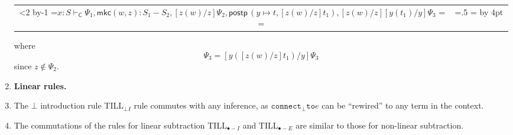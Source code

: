 \documentclass{lmcs}
\def\ScoreOverhang{4pt}			%
\def\ScoreOverhangLeft{\ScoreOverhang}
\def\ScoreOverhangRight{\ScoreOverhang}
\def\extraVskip{2pt}			%
\def\ruleScoreFiller{\hrule}		%
\def\defaultScoreFiller{\ruleScoreFiller}  %
\def\defaultBuildScore{\buildSingleScore}  %
\def\defaultHypSeparation{\hskip.2in}   %
\def\theHypSeparation{\defaultHypSeparation}
\def\alwaysScoreFiller{\defaultScoreFiller}	%
\def\alwaysBuildScore{\defaultBuildScore}
\def\theScoreFiller{\alwaysScoreFiller}	%
\def\buildScore{\alwaysBuildScore}   %
\def\hypKernAmt{0pt}	%
\def\defaultLeftLabel{}
\def\defaultRightLabel{}
\def\myTrue{Y}
\def\bottomAlignFlag{N}
\def\centerAlignFlag{N}
\def\thecur#1{\csname#1\number\theLevel\endcsname}
\def\prepBinary{%
	\ifnum\theLevel<2 
		\errmessage{Hypotheses missing!}
	\fi%
	\edef\rcurBox{\thecur{myBox}}%
	\edef\rcurScoreStart{\thecur{myScoreStart}}%
	\edef\rcurCenter{\thecur{myCenter}}%
	\edef\rcurScoreEnd{\thecur{myScoreEnd}}%
	\advance\theLevel by-1
	\edef\lcurBox{\thecur{myBox}}%
	\edef\lcurScoreStart{\thecur{myScoreStart}}%
	\edef\lcurCenter{\thecur{myCenter}}%
	\edef\lcurScoreEnd{\thecur{myScoreEnd}}%
}
\def\BinaryInfC#1{%
	\prepBinary%
	\buildConclusionC{#1}%
	\joinBinary%
	\resetInferenceDefaults%
	\ignorespaces%
}
\def\buildConclusionC#1{%
	\setbox\myBoxA=\hbox{#1}%
	\setbox\myBoxC =%
		\hbox{\hbox{\hskip\ScoreOverhangLeft\relax%
                        \unhcopy\myBoxA\hskip\ScoreOverhangRight\relax}}%
	\newScoreStart=0pt \relax%
	\newCenter=.5\wd\myBoxC \relax%
	\newScoreEnd=\wd\myBoxC%
        \advance \newCenter by \ScoreOverhangLeft%
}
\def\joinUnary{%
	\global\advance\curCenter by -\hypKernAmt%
	\ifnum\curCenter<\newCenter%
		\displace=\newCenter%
		\advance \displace by -\curCenter%
		\kernUpperBox%
	\else%
		\displace=\curCenter%
		\advance \displace by -\newCenter%
		\kernLowerBox%
	\fi%
        \ifnum \newScoreStart < \curScoreStart %
		\global \curScoreStart = \newScoreStart \fi%
	\ifnum \curScoreEnd < \newScoreEnd %
		\global \curScoreEnd = \newScoreEnd \fi%
	\ifnum \curScoreStart<\wd\myBoxLL%
		\global\displace = \wd\myBoxLL%
		\global\advance\displace by -\curScoreStart%
		\kernUpperBox%
		\kernLowerBox%
	\fi%
	\buildScore%
	\buildScoreLabels%
	\global \setbox \curBox =%
		\vbox{\box\curBox%
			\vskip\thisAboveSkip \relax%
			\nointerlineskip\box\myBoxD%
			\vskip\thisBelowSkip \relax%
			\nointerlineskip\box\myBoxC}%
	\global \curScoreStart=\newScoreStart%
	\global \curScoreEnd=\newScoreEnd%
	\global \curCenter=\newCenter%
}
\def\kernUpperBox{%
		\global\setbox\curBox =%
			\hbox{\hskip\displace\box\curBox}%
		\global\advance \curScoreStart by \displace%
		\global\advance \curScoreEnd by \displace%
		\global\advance\curCenter by \displace%
}
\def\kernLowerBox{%
		\global\setbox\myBoxC =%
			\hbox{\hskip\displace\unhbox\myBoxC}%
		\global\advance \newScoreStart by \displace%
		\global\advance \newScoreEnd by \displace%
		\global\advance\newCenter by \displace%
}
\def\joinBinary{%
	\setbox\myBoxA=\hbox{\theHypSeparation}
	\lcurScoreEnd=\rcurScoreEnd%
	\advance\lcurScoreEnd by\wd\lcurBox%
	\advance\lcurScoreEnd by\wd\myBoxA%
	\displace=\lcurScoreEnd%
	\advance\displace by -\lcurScoreStart%
	\lcurCenter=.5\displace%
	\advance\lcurCenter by\lcurScoreStart%
	\setbox\lcurBox=%
		\hbox{\box\lcurBox\unhcopy\myBoxA\box\rcurBox}%
	\displace=\newCenter%
	\advance\displace by -.5\newScoreStart%
	\advance\displace by -.5\newScoreEnd%
	\advance\lcurCenter by \displace%
	\edef\curBox{\lcurBox}%
	\edef\curScoreStart{\lcurScoreStart}%
	\edef\curScoreEnd{\lcurScoreEnd}%
	\edef\curCenter{\lcurCenter}%
	\joinUnary%
}
\def\DisplayProof{%
	\ifnum \theLevel=1 \relax \else%
		\errmessage{Proof tree badly specified.}%
	\fi%
	\edef\curBox{\thecur{myBox}}%
	\ifx\bottomAlignFlag\myTrue%
		\displace=0pt%
	\else%
		\displace=.5\ht\curBox%
		\ifx\centerAlignFlag\myTrue\relax
		\else%
		      	\advance\displace by -3pt%
		\fi%
	\fi%
	\leavevmode%
	\lower\displace\hbox{\copy\curBox}%
	\global\theLevel=0%
	\global\def\alwaysBuildScore{\defaultBuildScore}%
	\global\def\alwaysScoreFiller{\defaultScoreFiller}%
	\def\bottomAlignFlag{N}
	\def\centerAlignFlag{N}
	\resetInferenceDefaults%
	\ignorespaces
}
\def\buildSingleScore{%
	\displace=\curScoreEnd%
	\advance \displace by -\curScoreStart%
	\global\setbox \myBoxD =%
		\hbox to \displace{\expandafter\xleaders\theScoreFiller\hfill}%
}
\def\singleLine{%
	\gdef\buildScore{\buildSingleScore}%
	\ignorespaces
}
\def\insertBetweenHyps#1{%
	\gdef\theHypSeparation{#1}%
	\ignorespaces
}
\def\buildScoreLabels{%
	\scoreHeight = \ht\myBoxD%
	\scoreDepth = \dp\myBoxD%
	\leftLowerAmt=\ht\myBoxLL%
	\advance \leftLowerAmt by -\dp\myBoxLL%
	\advance \leftLowerAmt by -\scoreHeight%
	\advance \leftLowerAmt by \scoreDepth%
	\leftLowerAmt=.5\leftLowerAmt%
	\rightLowerAmt=\ht\myBoxRL%
	\advance \rightLowerAmt by -\dp\myBoxRL%
	\advance \rightLowerAmt by -\scoreHeight%
	\advance \rightLowerAmt by \scoreDepth%
	\rightLowerAmt=.5\rightLowerAmt%
	\displace = \curScoreStart%
	\advance\displace by -\wd\myBoxLL%
	\global\setbox\myBoxD =%
		\hbox{\hskip\displace%
			\lower\leftLowerAmt\copy\myBoxLL%
			\box\myBoxD%
			\lower\rightLowerAmt\copy\myBoxRL}%
	\global\thisAboveSkip = \ht\myBoxLL%
	\global\advance \thisAboveSkip by -\leftLowerAmt%
	\global\advance \thisAboveSkip by -\scoreHeight%
	\ifnum \thisAboveSkip<0 %
		\global\thisAboveSkip=0pt%
	\fi%
	\displace = \ht\myBoxRL%
	\advance \displace by -\rightLowerAmt%
	\advance \displace by -\scoreHeight%
	\ifnum \displace<0 %
		\displace=0pt%
	\fi%
	\ifnum \displace>\thisAboveSkip %
		\global\thisAboveSkip=\displace%
	\fi%
	\global\thisBelowSkip = \dp\myBoxLL%
	\global\advance\thisBelowSkip by \leftLowerAmt%
	\global\advance\thisBelowSkip by -\scoreDepth%
	\ifnum\thisBelowSkip<0 %
		\global\thisBelowSkip = 0pt%
	\fi%
	\displace = \dp\myBoxLL%
	\advance\displace by \rightLowerAmt%
	\advance\displace by -\scoreDepth%
	\ifnum\displace<0 %
		\displace = 0pt%
	\fi%
	\ifnum\displace>\thisBelowSkip%
		\global\thisBelowSkip = \displace%
	\fi
	\global\thisAboveSkip = -\thisAboveSkip%
	\global\thisBelowSkip = -\thisBelowSkip%
	\global\advance\thisAboveSkip by\extraVskip%
	\global\advance\thisBelowSkip by\extraVskip%
}
\def\resetInferenceDefaults{%
	\global\def\theHypSeparation{\defaultHypSeparation}%
	\global\setbox\myBoxLL=\hbox{\defaultLeftLabel}%
	\global\setbox\myBoxRL=\hbox{\defaultRightLabel}%
	\global\def\buildScore{\alwaysBuildScore}%
	\global\def\theScoreFiller{\alwaysScoreFiller}%
	\gdef\hypKernAmt{0pt}%
}
\def\lsub{\mathrel{\bullet\!-}}
\newcommand{\DualLNLLogicnt}[1]{\mathit{#1}}
\newcommand{\DualLNLLogicmv}[1]{\mathit{#1}}
\newcommand{\DualLNLLogicsym}[1]{#1}
\begin{document}
\begin{enumerate}
\begin{center}
\begin{tabular}{c}
      \BinaryInfC{$ \DualLNLLogicmv{x}  :  \DualLNLLogicnt{S}  \vdash_{\mathsf{C} }  \Psi_{{\mathrm{1}}}  \DualLNLLogicsym{,}   \mathsf{mkc}( \DualLNLLogicmv{w} , \DualLNLLogicmv{z} )   \DualLNLLogicsym{:}   \DualLNLLogicnt{S_{{\mathrm{1}}}}  -  \DualLNLLogicnt{S_{{\mathrm{2}}}}   \DualLNLLogicsym{,}  \DualLNLLogicsym{[}  \DualLNLLogicmv{z}  \DualLNLLogicsym{(}  \DualLNLLogicmv{w}  \DualLNLLogicsym{)}  \DualLNLLogicsym{/}  \DualLNLLogicmv{z}  \DualLNLLogicsym{]}  \Psi_{{\mathrm{2}}}  \DualLNLLogicsym{,}    \mathsf{postp}\,( \DualLNLLogicmv{y}  \mapsto  \DualLNLLogicnt{t} ,  \DualLNLLogicsym{[}  \DualLNLLogicmv{z}  \DualLNLLogicsym{(}  \DualLNLLogicmv{w}  \DualLNLLogicsym{)}  \DualLNLLogicsym{/}  \DualLNLLogicmv{z}  \DualLNLLogicsym{]}  \DualLNLLogicnt{t_{{\mathrm{1}}}} )    \DualLNLLogicsym{,}  \DualLNLLogicsym{[}  \DualLNLLogicmv{z}  \DualLNLLogicsym{(}  \DualLNLLogicmv{w}  \DualLNLLogicsym{)}  \DualLNLLogicsym{/}  \DualLNLLogicmv{z}  \DualLNLLogicsym{]}  \DualLNLLogicsym{[}  \DualLNLLogicmv{y}  \DualLNLLogicsym{(}  \DualLNLLogicnt{t_{{\mathrm{1}}}}  \DualLNLLogicsym{)}  \DualLNLLogicsym{/}  \DualLNLLogicmv{y}  \DualLNLLogicsym{]}  \Psi_{{\mathrm{3}}} $}
      \DisplayProof\\
    \end{tabular}
  \end{center}
  where 
  \begin{equation}
    \DualLNLLogicsym{[}  \DualLNLLogicmv{z}  \DualLNLLogicsym{(}  \DualLNLLogicmv{w}  \DualLNLLogicsym{)}  \DualLNLLogicsym{/}  \DualLNLLogicmv{z}  \DualLNLLogicsym{]}  \DualLNLLogicsym{[}  \DualLNLLogicmv{y}  \DualLNLLogicsym{(}  \DualLNLLogicnt{t_{{\mathrm{1}}}}  \DualLNLLogicsym{)}  \DualLNLLogicsym{/}  \DualLNLLogicmv{y}  \DualLNLLogicsym{]}  \Psi_{{\mathrm{3}}} =  \DualLNLLogicsym{[}  \DualLNLLogicmv{y}  \DualLNLLogicsym{(}  \DualLNLLogicsym{[}  \DualLNLLogicmv{z}  \DualLNLLogicsym{(}  \DualLNLLogicmv{w}  \DualLNLLogicsym{)}  \DualLNLLogicsym{/}  \DualLNLLogicmv{z}  \DualLNLLogicsym{]}  \DualLNLLogicnt{t_{{\mathrm{1}}}}  \DualLNLLogicsym{)}  \DualLNLLogicsym{/}  \DualLNLLogicmv{y}  \DualLNLLogicsym{]}  \Psi_{{\mathrm{3}}}
  \end{equation}
  since $\DualLNLLogicmv{z} \notin \Psi_{{\mathrm{2}}}$.
\item[] {\bf Linear rules.}
\item The $\bot$ introduction rule TILL$_{\bot I}$ rule commutes with any inference, as $\mathtt{connect}_{\bot}
  \mathtt{to} e$ can be ``rewired'' to any term in the context. 
\item The commutations of the rules for linear subtraction TILL$_{\lsub I}$ and TILL$_{\lsub E}$ are similar to those for non-linear subtraction. 

\end{enumerate}
\end{document}

